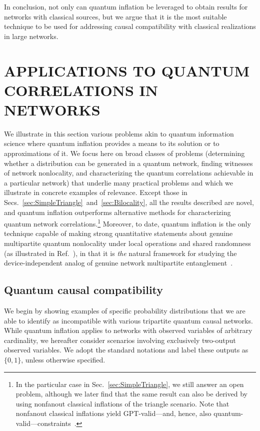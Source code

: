 \documentclass[superscriptaddress,aps,prx,nofootinbib,twocolumn,twoside,reprint,letterpaper,longbibliography]{revtex4-2}
\begin{document}
In conclusion, not only can quantum inflation be leveraged to obtain results for networks with classical sources, but we argue that it is the most suitable technique to be used for addressing causal compatibility with classical realizations in large networks.

\section{APPLICATIONS TO QUANTUM CORRELATIONS IN NETWORKS}\label{sec:results}
We illustrate in this section various problems akin to quantum information science where quantum inflation provides a means to its solution or to approximations of it.
We focus here on broad classes of problems (determining whether a distribution can be generated in a quantum network, finding witnesses of network nonlocality, and characterizing the quantum correlations achievable in a particular network) that underlie many practical problems and which we illustrate in concrete examples of relevance.
Except those in Secs.~\ref{sec:SimpleTriangle}~and~\ref{sec:Bilocality}, all the results described are novel, and quantum inflation outperforms alternative methods for characterizing quantum network correlations.\footnote{In the particular case in Sec.~\ref{sec:SimpleTriangle}, we still answer an open problem, although we later find that the same result can also be derived by using nonfanout classical inflations of the triangle scenario. Note that nonfanout classical inflations yield GPT-valid---and, hence, also quantum-valid---constraints~\cite{wolfe2016inflation}.}
Moreover, to date, quantum inflation is the only technique capable of making strong quantitative statements about genuine multipartite quantum nonlocality under local operations and shared randomness (as illustrated in Ref.~\cite{Schmid2020LOSR}), in that it is \emph{the} natural framework for studying the device-independent analog of genuine network multipartite entanglement~\cite{navascues2020gnme}.

\subsection{Quantum causal compatibility}
We begin by showing examples of specific probability distributions that we are able to identify as incompatible with various tripartite quantum causal networks.
While quantum inflation applies to networks with observed variables of arbitrary cardinality, we hereafter consider scenarios involving exclusively two-output observed variables. We adopt the standard notations and label these outputs as $\{0,1\}$, unless otherwise specified.
\end{document}
